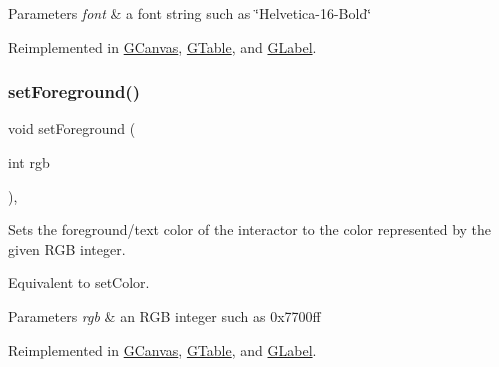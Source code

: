 \begin{DoxyParams}{Parameters}
{\em font} & a font string such as \char`\"{}\+Helvetica-\/16-\/\+Bold\char`\"{} \\
\hline
\end{DoxyParams}


Reimplemented in \mbox{\hyperlink{classGCanvas_ab39ef411fb13a52852ddd138c5932e2e}{G\+Canvas}}, \mbox{\hyperlink{classGTable_ab39ef411fb13a52852ddd138c5932e2e}{G\+Table}}, and \mbox{\hyperlink{classGLabel_ab39ef411fb13a52852ddd138c5932e2e}{G\+Label}}.

\mbox{\label{classGInteractor_a9eb856b5ff83a19df3831a31f15f4563}} 
\subsubsection{\texorpdfstring{set\+Foreground()}{setForeground()}\hspace{0.1cm}{\footnotesize\ttfamily [1/2]}}
{\footnotesize\ttfamily void set\+Foreground (\begin{DoxyParamCaption}\item[{int}]{rgb }\end{DoxyParamCaption})\hspace{0.3cm}{\ttfamily [virtual]}, {\ttfamily [inherited]}}



Sets the foreground/text color of the interactor to the color represented by the given R\+GB integer. 

Equivalent to set\+Color. 
\begin{DoxyParams}{Parameters}
{\em rgb} & an R\+GB integer such as 0x7700ff \\
\hline
\end{DoxyParams}


Reimplemented in \mbox{\hyperlink{classGCanvas_af9227e80cbfac55ce936fa5c99ffc954}{G\+Canvas}}, \mbox{\hyperlink{classGTable_af9227e80cbfac55ce936fa5c99ffc954}{G\+Table}}, and \mbox{\hyperlink{classGLabel_af9227e80cbfac55ce936fa5c99ffc954}{G\+Label}}.

\mbox{\label{classGInteractor_af59209aeadea6dfc6d97a2d8531f50e1}} 
